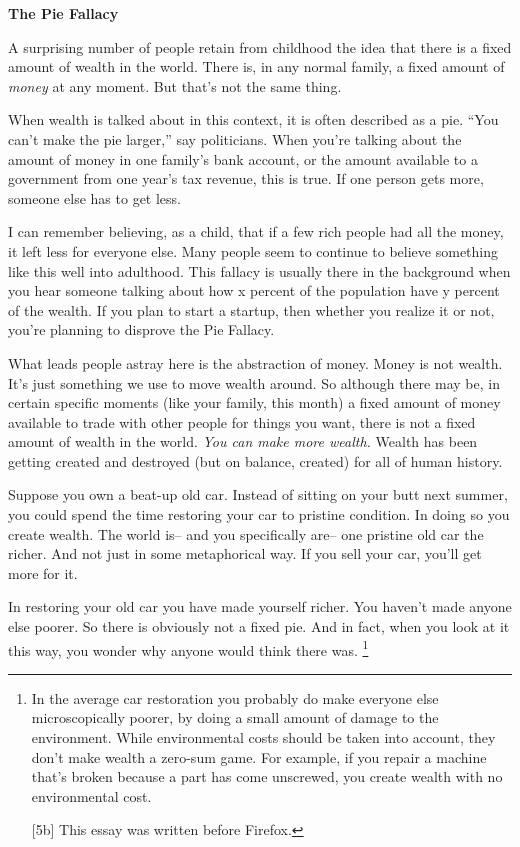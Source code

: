 \textbf{The Pie Fallacy}

A surprising number of people retain from childhood the idea that there
is a fixed amount of wealth in the world. There is, in any normal
family, a fixed amount of \emph{money} at any moment. But that's not the
same thing.

When wealth is talked about in this context, it is often described as a
pie. ``You can't make the pie larger,'' say politicians. When you're
talking about the amount of money in one family's bank account, or the
amount available to a government from one year's tax revenue, this is
true. If one person gets more, someone else has to get less.

I can remember believing, as a child, that if a few rich people had all
the money, it left less for everyone else. Many people seem to continue
to believe something like this well into adulthood. This fallacy is
usually there in the background when you hear someone talking about how
x percent of the population have y percent of the wealth. If you plan to
start a startup, then whether you realize it or not, you're planning to
disprove the Pie Fallacy.

What leads people astray here is the abstraction of money. Money is not
wealth. It's just something we use to move wealth around. So although
there may be, in certain specific moments (like your family, this month)
a fixed amount of money available to trade with other people for things
you want, there is not a fixed amount of wealth in the world. \emph{You
can make more wealth.} Wealth has been getting created and destroyed
(but on balance, created) for all of human history.

Suppose you own a beat-up old car. Instead of sitting on your butt next
summer, you could spend the time restoring your car to pristine
condition. In doing so you create wealth. The world is-- and you
specifically are-- one pristine old car the richer. And not just in some
metaphorical way. If you sell your car, you'll get more for it.

In restoring your old car you have made yourself richer. You haven't
made anyone else poorer. So there is obviously not a fixed pie. And in
fact, when you look at it this way, you wonder why anyone would think
there was. \footnote{In the average car restoration you probably do make everyone
else microscopically poorer, by doing a small amount of damage to the
environment. While environmental costs should be taken into account,
they don't make wealth a zero-sum game. For example, if you repair a
machine that's broken because a part has come unscrewed, you create
wealth with no environmental cost.

{[}5b{]} This essay was written before Firefox.}

